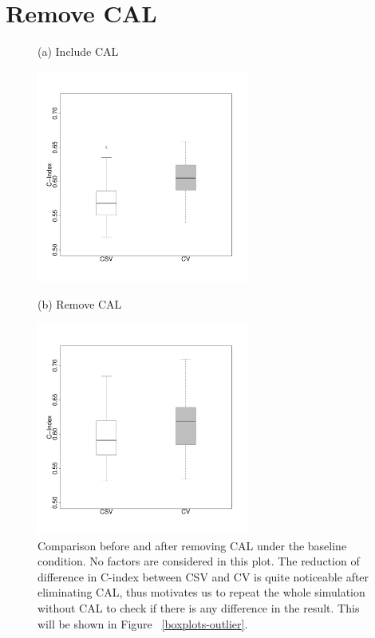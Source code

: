 \documentclass{article}
\begin{document}
\newpage
\section{Remove CAL}
  \begin{figure}[H]
    \centering
    \begin{minipage}[b]{0.5\linewidth}
    \centerline{(a) Include CAL}
    \includegraphics[width=7cm]{boxplot_withCAL.pdf}
    \end{minipage}%
    \begin{minipage}[b]{0.5\linewidth}
    \centerline{(b) Remove CAL}
    \includegraphics[width=7cm]{boxplot_rmCAL.pdf}
    \end{minipage}
    \caption{Comparison before and after removing CAL under the baseline condition. No factors are considered in this plot. The reduction of difference in C-index between CSV and CV is quite noticeable after eliminating CAL, thus motivates us to repeat the whole simulation without CAL to check if there is any difference in the result. This will be shown in Figure ~\ref{boxplots-outlier}.}
    \label{ourlier-cmp}
  \end{figure}
\end{document}
